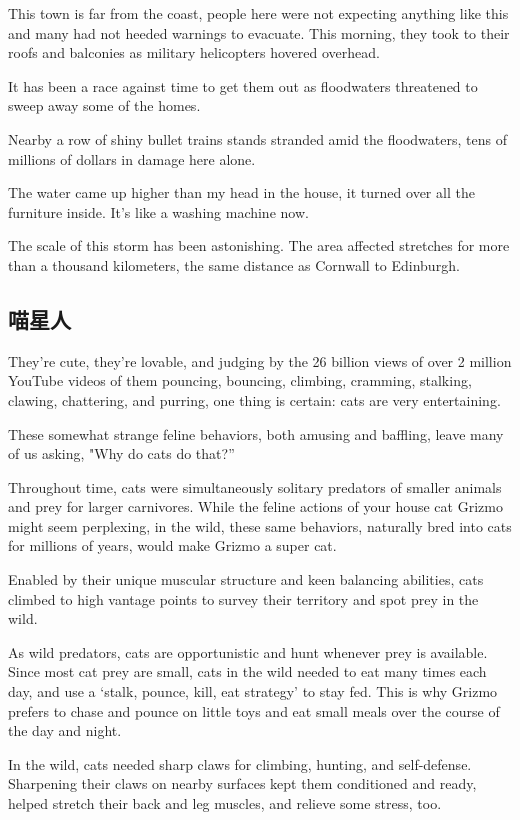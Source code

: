 This town is far from the coast, people here were not expecting anything like this and many had not heeded warnings to evacuate. This morning, they took to their roofs and balconies as military helicopters hovered overhead.

It has been a race against time to get them out as floodwaters threatened to sweep away some of the homes.

Nearby a row of shiny bullet trains stands stranded amid the floodwaters, tens of millions of dollars in damage here alone. 

The water came up higher than my head in the house, it turned over all the furniture inside. It's like a washing machine now.

The scale of this storm has been astonishing. The area affected stretches for more than a thousand kilometers, the same distance as Cornwall to Edinburgh.
\subsection{喵星人}
They're cute, they're lovable, and judging by the 26 billion views of over 2 million YouTube videos of them pouncing, bouncing, climbing, cramming, stalking, clawing, chattering, and purring, one thing is certain: cats are very entertaining.

These somewhat strange feline behaviors, both amusing and baffling, leave many of us asking, "Why do cats do that?”

Throughout time, cats were simultaneously solitary predators of smaller animals and prey for larger carnivores. While the feline actions of your house cat Grizmo might seem perplexing, in the wild, these same behaviors, naturally bred into cats for millions of years, would make Grizmo a super cat.

Enabled by their unique muscular structure and keen balancing abilities, cats climbed to high vantage points to survey their territory and spot prey in the wild.

As wild predators, cats are opportunistic and hunt whenever prey is available. Since most cat prey are small, cats in the wild needed to eat many times each day, and use a ‘stalk, pounce, kill, eat strategy' to stay fed. This is why Grizmo prefers to chase and pounce on little toys and eat small meals over the course of the day and night.

In the wild, cats needed sharp claws for climbing, hunting, and self-defense. Sharpening their claws on nearby surfaces kept them conditioned and ready, helped stretch their back and leg muscles, and relieve some stress, too.

